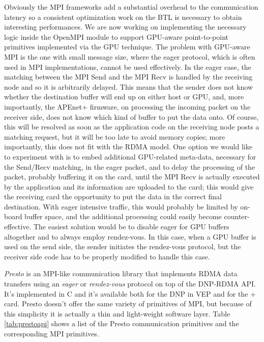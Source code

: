 Obviously the MPI frameworks add a substantial overhead
to the communication latency so a consistent optimization work on the
BTL is necessary to obtain interesting performances.
We are now working on implementing the necessary logic inside the
\apenetp OpenMPI module to support GPU-aware point-to-point primitives
implemented via the GPU \PtoP technique.  The problem with GPU-aware
MPI is the one with small message size, where the eager protocol,
which is often used in MPI implementations, cannot be used
effectively. In the eager case, the matching between the MPI Send and
the MPI Recv is handled by the receiving node and so it is arbitrarily
delayed. This means that the sender does not know whether the
destination buffer will end up on either host or GPU, and, more
importantly, the APEnet+ firmware, on processing the incoming packet
on the receiver side, does not know which kind of buffer to put the
data onto. Of course, this will be resolved as soon as the application
code on the receiving node posts a matching request, but it will be
too late to avoid memory copies; more importantly, this does not fit
with the RDMA model.  One option we would like to experiment with is
to embed additional GPU-related meta-data, necessary for the Send/Recv
matching, in the eager packet, and to delay the processing of the
packet, probably buffering it on the card, until the MPI Recv is
actually executed by the application and its information are uploaded
to the card; this would give the receiving card the opportunity to put
the data in the correct final destination. With eager intensive
traffic, this would probably be limited by on-board buffer space, and
the additional processing could easily become counter-effective.  The
easiest solution would be to disable eager for GPU buffers altogether
and to always employ rendez-vous. In this case, when a GPU buffer is
used on the send side, the sender initiates the rendez-vous protocol,
but the receiver side code has to be properly modified to handle this
case.  

\label{sec:presto}
\emph{Presto} is an MPI-like communication library that implements
RDMA data transfers using an \emph{eager} or \emph{rendez-vous}
protocol on top of the DNP-\apenetp RDMA API.  It's implemented in C
and it's available both for the DNP in VEP and for the \apenet+
card. Presto doesn't offer the same variety of primitives of MPI, but
because of this simplicity it is actually a thin and light-weight
software layer.  Table \ref{tab:prestoapi} shows a list of the Presto
communication primitives and the corresponding MPI primitives.

